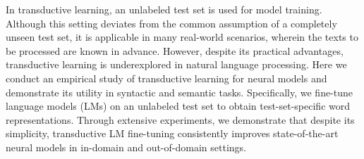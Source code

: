 In transductive learning, an unlabeled test set is used for model training.
Although this setting deviates from the common assumption of a completely unseen test set, it is applicable in many real-world scenarios, wherein the texts to be processed are known in advance.
However, despite its practical advantages, transductive learning is underexplored in natural language processing.
Here we conduct an empirical study of transductive learning for neural models and demonstrate its utility in syntactic and semantic tasks.
Specifically, we fine-tune language models (LMs) on an unlabeled test set to obtain test-set-specific word representations.
Through extensive experiments, we demonstrate that despite its simplicity, transductive LM fine-tuning consistently improves state-of-the-art neural models in in-domain and out-of-domain settings.